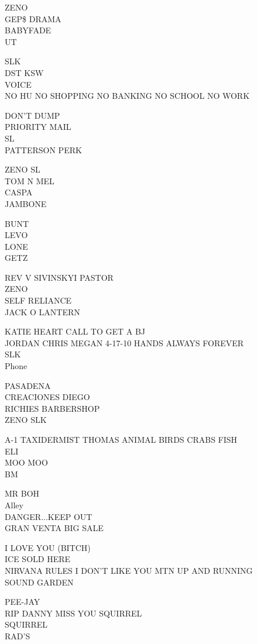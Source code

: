 \documentclass[10pt,letterpaper]{article}
\begin{document}
ZENO\\
GEP\$ DRAMA\\
BABYFADE\\
UT

SLK\\
DST KSW\\
VOICE\\
NO HU NO SHOPPING NO BANKING NO SCHOOL NO WORK

DON'T DUMP\\
PRIORITY MAIL\\
SL\\
PATTERSON PERK

ZENO SL\\
TOM N MEL\\
CASPA\\
JAMBONE

BUNT\\
LEVO\\
LONE\\
GETZ

REV V SIVINSKYI PASTOR\\
ZENO\\
SELF RELIANCE\\
JACK O LANTERN

KATIE HEART CALL TO GET A BJ\\
JORDAN CHRIS MEGAN 4{-}17{-}10 HANDS ALWAYS FOREVER\\
SLK\\
Phone

PASADENA\\
CREACIONES DIEGO\\
RICHIES BARBERSHOP\\
ZENO SLK

A{-}1 TAXIDERMIST THOMAS ANIMAL BIRDS CRABS FISH\\
ELI\\
MOO MOO\\
BM

MR BOH\\
Alley\\
DANGER...KEEP OUT\\
GRAN VENTA BIG SALE

I LOVE YOU (BITCH)\\
ICE SOLD HERE\\
NIRVANA RULES I DON'T LIKE YOU MTN UP AND RUNNING\\
SOUND GARDEN

PEE{-}JAY\\
RIP DANNY MISS YOU SQUIRREL\\
SQUIRREL\\
RAD'S
\end{document}
